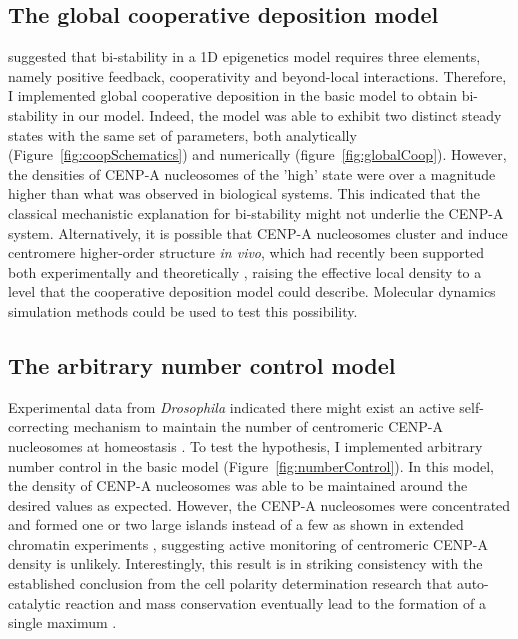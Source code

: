 \subsection{The global cooperative deposition model}

\cite{Dodd2017} suggested that bi-stability in a 1D epigenetics model requires three elements, namely positive feedback, cooperativity and beyond-local interactions. Therefore, I implemented global cooperative deposition in the basic model to obtain bi-stability in our model. Indeed, the model was able to exhibit two distinct steady states with the same set of parameters, both analytically (Figure~\ref{fig:coopSchematics}) and numerically (figure~\ref{fig:globalCoop}). However, the densities of CENP-A nucleosomes of the 'high' state were over a magnitude higher than what was observed in biological systems. This indicated that the classical mechanistic explanation for bi-stability might not underlie the CENP-A system. Alternatively, it is possible that CENP-A nucleosomes cluster and induce centromere higher-order structure \textit{in vivo}, which had recently been supported both experimentally \citep{Zhou2022, Andronov2019} and theoretically \citep{Camara2021ASpecies}, raising the effective local density to a level that the cooperative deposition model could describe. Molecular dynamics simulation methods could be used to test this possibility. 

\subsection{The arbitrary number control model}

Experimental data from \textit{Drosophila} indicated there might exist an active self-correcting mechanism to maintain the number of centromeric CENP-A nucleosomes at homeostasis \citep{Pauleau2019TheCells}. To test the hypothesis, I implemented arbitrary number control in the basic model (Figure~\ref{fig:numberControl}). In this model, the density of CENP-A nucleosomes was able to be maintained around the desired values as expected. However, the CENP-A nucleosomes were concentrated and formed one or two large islands instead of a few as shown in extended chromatin experiments \citep{Blower2002ConservedHumans, Dunleavy2011H3.3Phase., Kyriacou2018}, suggesting active monitoring of centromeric CENP-A density is unlikely. Interestingly, this result is in striking consistency with the established conclusion from the cell polarity determination research that auto-catalytic reaction and mass conservation eventually lead to the formation of a single maximum \citep{Goryachev2020CompeteOutcomes, Goehring2012OrganelleComponents, Otsuji2007APolarity}.

